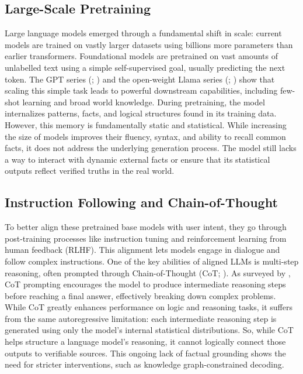 \subsection{Large-Scale Pretraining}

Large language models emerged through a fundamental shift in scale: current models are trained on vastly larger datasets using billions more parameters than earlier transformers. Foundational models are pretrained on vast amounts of unlabelled text using a simple self-supervised goal, usually predicting the next token. The GPT series (\citealt{brown2020gpt3}; \citealt{openai2024gpt4technicalreport}) and the open-weight Llama series (\citealt{touvron2023llama}; \citealt{dubey2024llama3}) show that scaling this simple task leads to powerful downstream capabilities, including few-shot learning and broad world knowledge. During pretraining, the model internalizes patterns, facts, and logical structures found in its training data. However, this memory is fundamentally static and statistical. While increasing the size of models improves their fluency, syntax, and ability to recall common facts, it does not address the underlying generation process. The model still lacks a way to interact with dynamic external facts or ensure that its statistical outputs reflect verified truths in the real world.

\subsection{Instruction Following and Chain-of-Thought}

To better align these pretrained base models with user intent, they go through post-training processes like instruction tuning and reinforcement learning from human feedback (RLHF). This alignment lets models engage in dialogue and follow complex instructions. One of the key abilities of aligned LLMs is multi-step reasoning, often prompted through Chain-of-Thought (CoT; \citealt{wei2022cot}). As surveyed by \citet{huang2023towards}, CoT prompting encourages the model to produce intermediate reasoning steps before reaching a final answer, effectively breaking down complex problems. While CoT greatly enhances performance on logic and reasoning tasks, it suffers from the same autoregressive limitation: each intermediate reasoning step is generated using only the model’s internal statistical distributions. So, while CoT helps structure a language model’s reasoning, it cannot logically connect those outputs to verifiable sources. This ongoing lack of factual grounding shows the need for stricter interventions, such as knowledge graph-constrained decoding.

